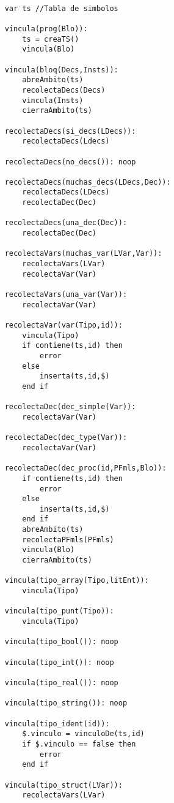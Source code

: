 
\begin{lstlisting}

    var ts //Tabla de simbolos

    vincula(prog(Blo)):
        ts = creaTS()
        vincula(Blo)

    vincula(bloq(Decs,Insts)):
        abreAmbito(ts)
        recolectaDecs(Decs)
        vincula(Insts)
        cierraAmbito(ts)
    
    recolectaDecs(si_decs(LDecs)):
        recolectaDecs(Ldecs)
    
    recolectaDecs(no_decs()): noop
    
    recolectaDecs(muchas_decs(LDecs,Dec)):
        recolectaDecs(LDecs)
        recolectaDec(Dec)
    
    recolectaDecs(una_dec(Dec)):
        recolectaDec(Dec)

    recolectaVars(muchas_var(LVar,Var)):
        recolectaVars(LVar)
        recolectaVar(Var)

    recolectaVars(una_var(Var)):
        recolectaVar(Var)
    
    recolectaVar(var(Tipo,id)):
        vincula(Tipo)
        if contiene(ts,id) then
            error
        else
            inserta(ts,id,$)
        end if
    
    recolectaDec(dec_simple(Var)):
        recolectaVar(Var)

    recolectaDec(dec_type(Var)):
        recolectaVar(Var)
    
    recolectaDec(dec_proc(id,PFmls,Blo)):
        if contiene(ts,id) then
            error
        else
            inserta(ts,id,$)
        end if
        abreAmbito(ts)
        recolectaPFmls(PFmls)
        vincula(Blo)
        cierraAmbito(ts)

    vincula(tipo_array(Tipo,litEnt)):
        vincula(Tipo)

    vincula(tipo_punt(Tipo)):
        vincula(Tipo)

    vincula(tipo_bool()): noop

    vincula(tipo_int()): noop

    vincula(tipo_real()): noop

    vincula(tipo_string()): noop

    vincula(tipo_ident(id)):
        $.vinculo = vinculoDe(ts,id)
        if $.vinculo == false then
            error
        end if

    vincula(tipo_struct(LVar)):
        recolectaVars(LVar)


\end{lstlisting}
